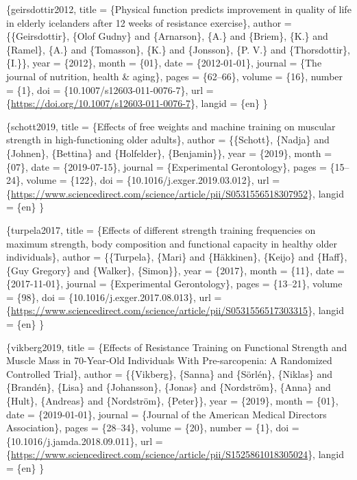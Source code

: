 \documentclass[
]{book}
\begin{document}
\citet{article}\{geirsdottir2012,
title = \{Physical function predicts improvement in quality of life in elderly icelanders after 12 weeks of resistance exercise\},
author = \{\{Geirsdottir\}, \{Olof Gudny\} and \{Arnarson\}, \{A.\} and \{Briem\}, \{K.\} and \{Ramel\}, \{A.\} and \{Tomasson\}, \{K.\} and \{Jonsson\}, \{P. V.\} and \{Thorsdottir\}, \{I.\}\},
year = \{2012\},
month = \{01\},
date = \{2012-01-01\},
journal = \{The journal of nutrition, health \& aging\},
pages = \{62--66\},
volume = \{16\},
number = \{1\},
doi = \{10.1007/s12603-011-0076-7\},
url = \{\url{https://doi.org/10.1007/s12603-011-0076-7}\},
langid = \{en\}
\}

\citet{article}\{schott2019,
title = \{Effects of free weights and machine training on muscular strength in high-functioning older adults\},
author = \{\{Schott\}, \{Nadja\} and \{Johnen\}, \{Bettina\} and \{Holfelder\}, \{Benjamin\}\},
year = \{2019\},
month = \{07\},
date = \{2019-07-15\},
journal = \{Experimental Gerontology\},
pages = \{15--24\},
volume = \{122\},
doi = \{10.1016/j.exger.2019.03.012\},
url = \{\url{https://www.sciencedirect.com/science/article/pii/S0531556518307952}\},
langid = \{en\}
\}

\citet{article}\{turpela2017,
title = \{Effects of different strength training frequencies on maximum strength, body composition and functional capacity in healthy older individuals\},
author = \{\{Turpela\}, \{Mari\} and \{Häkkinen\}, \{Keijo\} and \{Haff\}, \{Guy Gregory\} and \{Walker\}, \{Simon\}\},
year = \{2017\},
month = \{11\},
date = \{2017-11-01\},
journal = \{Experimental Gerontology\},
pages = \{13--21\},
volume = \{98\},
doi = \{10.1016/j.exger.2017.08.013\},
url = \{\url{https://www.sciencedirect.com/science/article/pii/S0531556517303315}\},
langid = \{en\}
\}

\citet{article}\{vikberg2019,
title = \{Effects of Resistance Training on Functional Strength and Muscle Mass in 70-Year-Old Individuals With Pre-sarcopenia: A Randomized Controlled Trial\},
author = \{\{Vikberg\}, \{Sanna\} and \{Sörlén\}, \{Niklas\} and \{Brandén\}, \{Lisa\} and \{Johansson\}, \{Jonas\} and \{Nordström\}, \{Anna\} and \{Hult\}, \{Andreas\} and \{Nordström\}, \{Peter\}\},
year = \{2019\},
month = \{01\},
date = \{2019-01-01\},
journal = \{Journal of the American Medical Directors Association\},
pages = \{28--34\},
volume = \{20\},
number = \{1\},
doi = \{10.1016/j.jamda.2018.09.011\},
url = \{\url{https://www.sciencedirect.com/science/article/pii/S1525861018305024}\},
langid = \{en\}
\}
\end{document}
